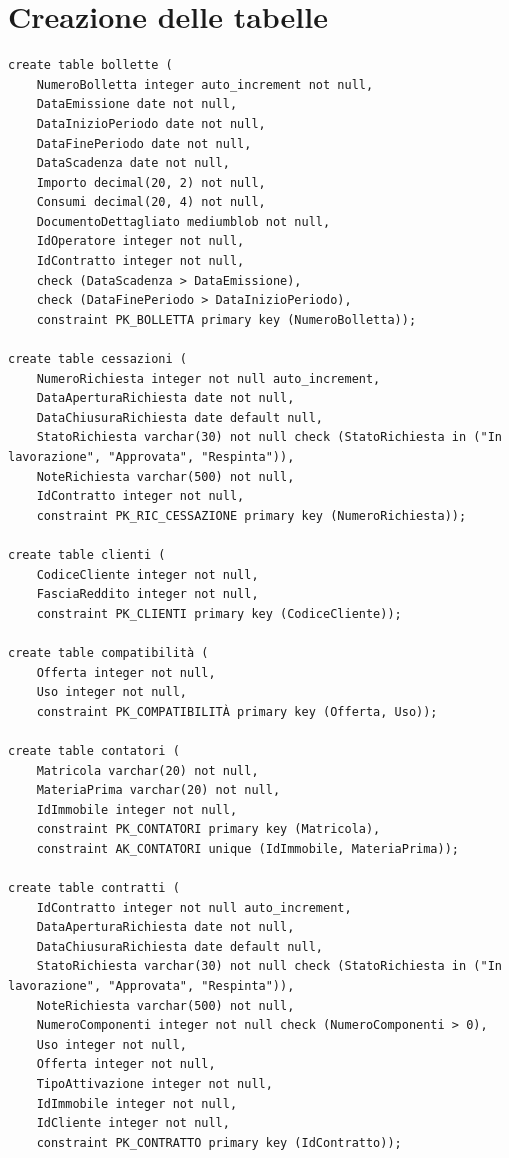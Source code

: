\documentclass[a4paper,12pt]{report}
\begin{document}
\section{Creazione delle tabelle}
\begin{lstlisting}
create table bollette (
    NumeroBolletta integer auto_increment not null,
    DataEmissione date not null,
    DataInizioPeriodo date not null,
    DataFinePeriodo date not null,
    DataScadenza date not null,
    Importo decimal(20, 2) not null,
    Consumi decimal(20, 4) not null,
    DocumentoDettagliato mediumblob not null,
    IdOperatore integer not null,
    IdContratto integer not null,
    check (DataScadenza > DataEmissione),
    check (DataFinePeriodo > DataInizioPeriodo),
    constraint PK_BOLLETTA primary key (NumeroBolletta));
    
create table cessazioni (
    NumeroRichiesta integer not null auto_increment,
    DataAperturaRichiesta date not null,
    DataChiusuraRichiesta date default null,
    StatoRichiesta varchar(30) not null check (StatoRichiesta in ("In lavorazione", "Approvata", "Respinta")),
    NoteRichiesta varchar(500) not null,
    IdContratto integer not null,
    constraint PK_RIC_CESSAZIONE primary key (NumeroRichiesta));
    
create table clienti (
    CodiceCliente integer not null,
    FasciaReddito integer not null,
    constraint PK_CLIENTI primary key (CodiceCliente));

create table compatibilità (
    Offerta integer not null,
    Uso integer not null,
    constraint PK_COMPATIBILITÀ primary key (Offerta, Uso));
    
create table contatori (
    Matricola varchar(20) not null,
    MateriaPrima varchar(20) not null,
    IdImmobile integer not null,
    constraint PK_CONTATORI primary key (Matricola),
    constraint AK_CONTATORI unique (IdImmobile, MateriaPrima));

create table contratti (
    IdContratto integer not null auto_increment,
    DataAperturaRichiesta date not null,
    DataChiusuraRichiesta date default null,
    StatoRichiesta varchar(30) not null check (StatoRichiesta in ("In lavorazione", "Approvata", "Respinta")),
    NoteRichiesta varchar(500) not null,
    NumeroComponenti integer not null check (NumeroComponenti > 0),
    Uso integer not null,
    Offerta integer not null,
    TipoAttivazione integer not null,
    IdImmobile integer not null,
    IdCliente integer not null,
    constraint PK_CONTRATTO primary key (IdContratto));


\end{lstlisting}
\end{document}
